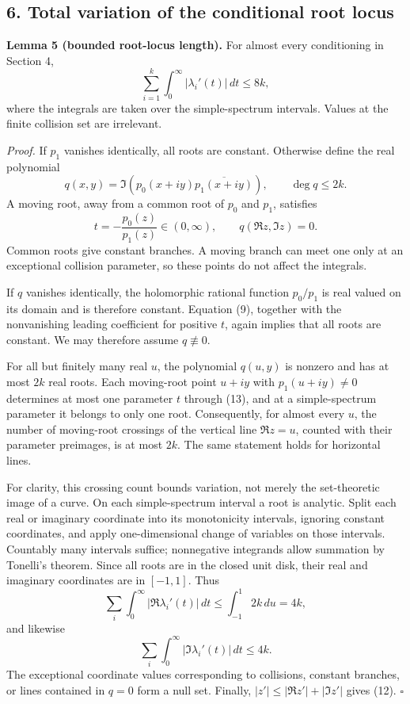 \documentclass[
  11pt,
]{article}
\begin{document}
\subsection{6. Total variation of the conditional root
locus}\label{total-variation-of-the-conditional-root-locus}

\textbf{Lemma 5 (bounded root-locus length).} For almost every
conditioning in Section 4, \[
\sum_{i=1}^k\int_0^\infty|\lambda_i'(t)|\,dt\leq8k, \tag{12}
\] where the integrals are taken over the simple-spectrum intervals.
Values at the finite collision set are irrelevant.

\emph{Proof.} If \(p_1\) vanishes identically, all roots are constant.
Otherwise define the real polynomial \[
q(x,y)=\Im\left(p_0(x+iy)\overline{p_1(x+iy)}\right),
\qquad \deg q\leq2k.
\] A moving root, away from a common root of \(p_0\) and \(p_1\),
satisfies \[
t=-\frac{p_0(z)}{p_1(z)}\in(0,\infty),\qquad q(\Re z,\Im z)=0. \tag{13}
\] Common roots give constant branches. A moving branch can meet one
only at an exceptional collision parameter, so these points do not
affect the integrals.

If \(q\) vanishes identically, the holomorphic rational function
\(p_0/p_1\) is real valued on its domain and is therefore constant.
Equation (9), together with the nonvanishing leading coefficient for
positive \(t\), again implies that all roots are constant. We may
therefore assume \(q\not\equiv0\).

For all but finitely many real \(u\), the polynomial \(q(u,y)\) is
nonzero and has at most \(2k\) real roots. Each moving-root point
\(u+iy\) with \(p_1(u+iy)\ne0\) determines at most one parameter \(t\)
through (13), and at a simple-spectrum parameter it belongs to only one
root. Consequently, for almost every \(u\), the number of moving-root
crossings of the vertical line \(\Re z=u\), counted with their parameter
preimages, is at most \(2k\). The same statement holds for horizontal
lines.

For clarity, this crossing count bounds variation, not merely the
set-theoretic image of a curve. On each simple-spectrum interval a root
is analytic. Split each real or imaginary coordinate into its
monotonicity intervals, ignoring constant coordinates, and apply
one-dimensional change of variables on those intervals. Countably many
intervals suffice; nonnegative integrands allow summation by Tonelli's
theorem. Since all roots are in the closed unit disk, their real and
imaginary coordinates are in \([-1,1]\). Thus \[
\sum_i\int_0^\infty|\Re\lambda_i'(t)|\,dt
\leq\int_{-1}^1 2k\,du=4k,
\] and likewise \[
\sum_i\int_0^\infty|\Im\lambda_i'(t)|\,dt\leq4k.
\] The exceptional coordinate values corresponding to collisions,
constant branches, or lines contained in \(q=0\) form a null set.
Finally, \(|z'|\leq|\Re z'|+|\Im z'|\) gives (12). \(\square\)
\end{document}
